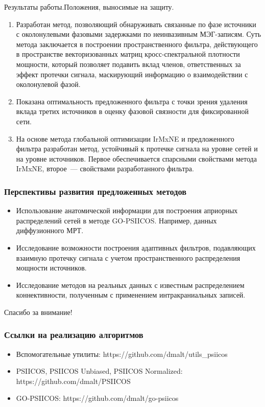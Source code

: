 \documentclass[12pt]{beamer}
\begin{document}
\begin{frame}{Результаты работы.}{Положения, выносимые на защиту.}
\begin{enumerate}
    \footnotesize
  \item Разработан метод, позволяющий обнаруживать связанные по фазе источники с околонулевыми фазовыми задержками
      по неинвазивным МЭГ-записям. Суть метода заключается в построении пространственного фильтра,
      действующего в пространстве векторизованных матриц кросс-спектральной плотности мощности,
      который позволяет подавить вклад членов, ответственных за эффект протечки сигнала, маскирующий
      информацию о взаимодействии с околонулевой фазой.
  \item Показана оптимальность предложенного фильтра с точки зрения удаления вклада третих источников
      в оценку фазовой связности для фиксированной сети.
  \item На основе метода глобальной оптимизации IrMxNE и предложенного фильтра разработан метод,
      устойчивый к протечке сигнала на уровне сетей и на уровне источников. Первое обеспечивается
      спарсными свойствами метода IrMxNE, второе~--- свойствами разработанного фильтра.
\end{enumerate}
\end{frame}

\begin{frame}
\frametitle{Перспективы развития предложенных методов}
\begin{itemize}
    \footnotesize
  \item Использование анатомической информации для построения априорных распределений сетей в методе GO-PSIICOS.
      Например, данных диффузионного МРТ.
  \item Исследование возможности построения адаптивных фильтров, подавляющих взаимную протечку сигнала с учетом
      пространственного распределения мощности источников.
  \item Исследование методов на реальных данных с известным распределением коннективности, полученным
    с применением интракраниальных записей.
\end{itemize}
\end{frame}

\begin{frame}
\begin{center}
Спасибо за внимание!
\end{center}
\end{frame}

\begin{frame}[t]
    \vspace{2cm}
    \frametitle{Ссылки на реализацию алгоритмов}
    \begin{itemize}
        \item Вспомогательные утилиты: https://github.com/dmalt/utils\_psiicos
        \item PSIICOS, PSIICOS Unbiased, PSIICOS Normalized: https://github.com/dmalt/PSIICOS
        \item GO-PSIICOS: https://github.com/dmalt/go-psiicos
    \end{itemize}
\end{frame}
\end{document}
